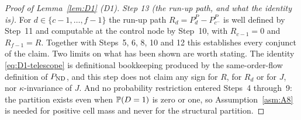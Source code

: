 \begin{proof}[Proof of Lemma~\ref{lem:D1} (D1)]
\emph{Step 13 (the run-up path, and what the identity is).} For $d \in \{c-1,\dots,f-1\}$ the run-up
path $R_d = P_d^P - P_{c^-}^P$ is well defined by Step~11 and computable at the control node by
Step~10, with $R_{c-1} = 0$ and $R_{f-1} = R$. Together with Steps~5, 6, 8, 10 and 12 this
establishes every conjunct of the claim. Two limits on what has been shown are worth stating. The
identity \eqref{eq:D1-telescope} is definitional bookkeeping produced by the same-order-flow
definition of $P_{\mathrm{ND}}$, and this step does not claim any sign for $R$, for $R_d$ or for $J$, nor
$\kappa$-invariance of $J$. And no probability restriction entered Steps~4 through~9: the partition
exists even when $\mathbb{P}(D=1)$ is zero or one, so Assumption~\ref{asm:A8} is needed for positive cell
mass and never for the structural partition.
\end{proof}

